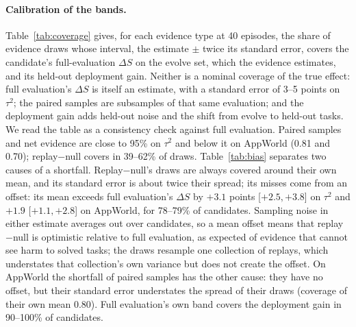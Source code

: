 \documentclass[11pt]{article}
\begin{document}
\begin{table}[t]
\centering
\small
\setlength{\tabcolsep}{4pt}
\caption{Decision value on r2+r3 (common error check, points per round, block bootstrap) under three decision rules. ``Own band'': full and sequential full evaluation decided with twice their own standard error, as the other rules already are, so only their rows change. ``One criterion'': every rule admits a candidate only if its estimate exceeds twice its standard error and the cost condition holds.}
\label{tab:ablation}
\end{table}

\paragraph{Calibration of the bands.} Table~\ref{tab:coverage} gives, for each evidence type at 40 episodes, the share of evidence draws whose interval, the estimate $\pm$ twice its standard error, covers the candidate's full-evaluation $\Delta S$ on the evolve set, which the evidence estimates, and its held-out deployment gain. Neither is a nominal coverage of the true effect: full evaluation's $\Delta S$ is itself an estimate, with a standard error of 3--5 points on $\tau^2$; the paired samples are subsamples of that same evaluation; and the deployment gain adds held-out noise and the shift from evolve to held-out tasks. We read the table as a consistency check against full evaluation. Paired samples and net evidence are close to 95\% on $\tau^2$ and below it on AppWorld (0.81 and 0.70); replay$-$null covers in 39--62\% of draws. Table~\ref{tab:bias} separates two causes of a shortfall. Replay$-$null's draws are always covered around their own mean, and its standard error is about twice their spread; its misses come from an offset: its mean exceeds full evaluation's $\Delta S$ by $+3.1$ points [$+2.5,+3.8$] on $\tau^2$ and $+1.9$ [$+1.1,+2.8$] on AppWorld, for 78--79\% of candidates. Sampling noise in either estimate averages out over candidates, so a mean offset means that replay$-$null is optimistic relative to full evaluation, as expected of evidence that cannot see harm to solved tasks; the draws resample one collection of replays, which understates that collection's own variance but does not create the offset. On AppWorld the shortfall of paired samples has the other cause: they have no offset, but their standard error understates the spread of their draws (coverage of their own mean 0.80). Full evaluation's own band covers the deployment gain in 90--100\% of candidates.
\end{document}
